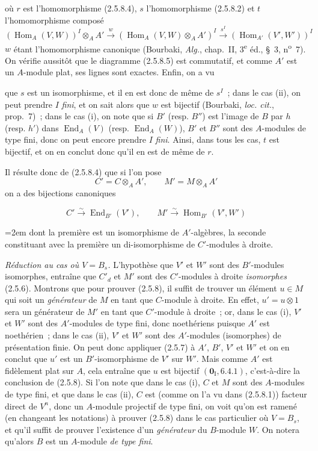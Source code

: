 où $r$ est l'homomorphisme (2.5.8.4), $s$ l'homomorphisme (2.5.8.2) et
$t$ l'homomorphisme composé
\[
(\operatorname{Hom}_A(V,W))^I\otimes_A A'
\xrightarrow{w}(\operatorname{Hom}_A(V,W)\otimes_A A')^I
\xrightarrow{s^I}(\operatorname{Hom}_{A'}(V',W'))^I
\]
$w$ étant l'homomorphisme canonique (Bourbaki, \emph{Alg.}, chap.~II,
3\textsuperscript{e} éd., \S~3, n\textsuperscript{o}~7). On vérifie aussitôt
que le diagramme (2.5.8.5) est commutatif, et comme $A'$ est un $A$-module
plat, ses lignes sont exactes. Enfin, on a vu

que $s$ est un isomorphisme, et il en est donc de même de $s^I$~; dans le cas
(ii), on peut prendre $I$ \emph{fini}, et on sait alors que $w$ est bijectif
(Bourbaki, \emph{loc. cit.}, prop.~7)~; dans le cas (i), on note que si $B'$
(resp. $B''$) est l'image de $B$ par $h$ (resp. $h'$) dans
$\operatorname{End}_A(V)$ (resp. $\operatorname{End}_A(W)$), $B'$ et $B''$
sont des $A$-modules de type fini, donc on peut encore prendre $I$ \emph{fini}.
Ainsi, dans tous les cas, $t$ est bijectif, et on en conclut donc qu'il en est
de même de $r$.

Il résulte donc de (2.5.8.4) que si l'on pose
\[
C'=C\otimes_A A',\qquad M'=M\otimes_A A'
\]
on a des bijections canoniques

\begin{env}[2.5.8.6]
\label{IV.2.5.8.6-fr}
\[
C'\xrightarrow{\sim}\operatorname{End}_{B'}(V'),\qquad
M'\xrightarrow{\sim}\operatorname{Hom}_{B'}(V',W')
\]
{\emergencystretch=2em
dont la première est un isomorphisme de $A'$-algèbres, la seconde constituant
avec la première un di-isomorphisme de $C'$-modules à droite.\par}
\end{env}

\begin{env}[2.5.8.7]
\label{IV.2.5.8.7-fr}
\emph{Réduction au cas où $V=B_s$.} L'hypothèse que $V'$ et $W'$ sont des
$B'$-modules isomorphes, entraîne que $C'_d$ et $M'$ sont des $C'$-modules à
droite \emph{isomorphes} (2.5.6). Montrons que pour prouver (2.5.8), il suffit de
trouver un élément $u\in M$ qui soit un \emph{générateur} de $M$ en tant que
$C$-module à droite. En effet, $u'=u\otimes1$ sera un générateur de $M'$ en
tant que $C'$-module à droite~; or, dans le cas (i), $V'$ et $W'$ sont des
$A'$-modules de type fini, donc noethériens puisque $A'$ est noethérien~;
dans le cas (ii), $V'$ et $W'$ sont des $A'$-modules (isomorphes) de
présentation finie. On peut donc appliquer (2.5.7) à $A'$, $B'$, $V'$ et
$W'$ et on en conclut que $u'$ est un $B'$-isomorphisme de $V'$ sur $W'$.
Mais comme $A'$ est fidèlement plat sur $A$, cela entraîne que $u$ est
bijectif $(\mathbf{0}_{\mathrm I},6.4.1)$, c'est-à-dire la conclusion de (2.5.8). Si
l'on note que dans le cas (i), $C$ et $M$ sont des $A$-modules de type fini,
et que dans le cas (ii), $C$ est (comme on l'a vu dans (2.5.8.1)) facteur
direct de $V^n$, donc un $A$-module projectif de type fini, on voit qu'on est
ramené (en changeant les notations) à prouver (2.5.8) dans le cas particulier
où $V=B_s$, et qu'il suffit de prouver l'existence d'un \emph{générateur} du
$B$-module $W$. On notera qu'alors $B$ est un $A$-module \emph{de type fini}.
\end{env}

